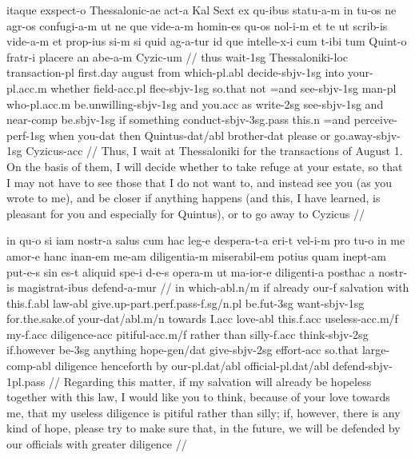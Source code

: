 \documentclass[oneside]{book}
\begin{document}
\vspace{10pt}
\ex[exno=PROIEL 77240]
	\par
	\begingl
		\gla itaque exspect-o Thessalonic-ae act-a Kal Sext ex qu-ibus statu-a-m in tu-os ne agr-os confugi-a-m ut ne que vide-a-m homin-es qu-os nol-i-m et te ut scrib-is vide-a-m et prop-ius si-m si quid ag-a-tur id que intelle-x-i cum t-ibi tum Quint-o fratr-i placere an abe-a-m Cyzic-um //
		\glb thus wait-{\sc 1sg} Thessaloniki-{\sc loc} transaction-{\sc pl} first.day august from which-{\sc pl.abl} decide-{\sc sbjv-1sg} into your-{\sc pl.acc.m} whether field-{\sc acc.pl} flee-{\sc sbjv-1sg} so.that not =and see-{\sc sbjv-1sg} man-{\sc pl} who-{\sc pl.acc.m} be.unwilling-{\sc sbjv-1sg} and you.{\sc acc} as write-{\sc 2sg} see-{\sc sbjv-1sg} and near-{\sc comp} be.{\sc sbjv-1sg} if something conduct-{\sc sbjv-3sg.pass} this.{\sc n} =and  perceive-{\sc perf-1sg} when you-{\sc dat} then Quintus-{\sc dat/abl} brother-{\sc dat} please or go.away-{\sc sbjv-1sg} Cyzicus-{\sc acc} //
		\glft Thus, I wait at Thessaloniki for the transactions of August 1. On the basis of them, I will decide whether to take refuge at your estate, so that I may not have to see those that I do not want to, and instead see you (as you wrote to me), and be closer if anything happens (and this, I have learned, is pleasant for you and especially for Quintus), or to go away to Cyzicus //
	\endgl
\xe 
\vspace{10pt}

\ex[exno=PROIEL 77314]
	\par
	\begingl
		\gla in qu-o si iam nostr-a salus cum hac leg-e despera-t-a eri-t vel-i-m pro tu-o in me amor-e hanc inan-em me-am diligentia-m miserabil-em potius quam inept-am put-e-s sin es-t aliquid spe-i d-e-s opera-m ut ma-ior-e diligenti-a posthac a nostr-is magistrat-ibus defend-a-mur //
		\glb in which-{\sc abl.n/m} if already our-{\sc f} salvation with this.{\sc f.abl} law-{\sc abl} give.up-{\sc part.perf.pass-f.sg/n.pl} be.{\sc fut-3sg} want-{\sc sbjv-1sg} for.the.sake.of your-{\sc dat/abl.m/n} towards I.{\sc acc} love-{\sc abl} this.{\sc f.acc} useless-{\sc acc.m/f} my-{\sc f.acc} diligence-{\sc acc} pitiful-{\sc acc.m/f} rather than silly-{\sc f.acc} think-{\sc sbjv-2sg} if.however be-{\sc 3sg} anything hope-{\sc gen/dat} give-{\sc sbjv-2sg} effort-{\sc acc} so.that large-{\sc comp-abl} diligence henceforth by our-{\sc pl.dat/abl} official-{\sc pl.dat/abl} defend-{\sc sbjv-1pl.pass} //
		\glft Regarding this matter, if my salvation will already be hopeless together with this law, I would like you to think, because of your love towards me, that my useless diligence is pitiful rather than silly; if, however, there is any kind of hope, please try to make sure that, in the future, we will be defended by our officials with greater diligence //
	\endgl
\xe
\vspace{10pt}
\end{document}
